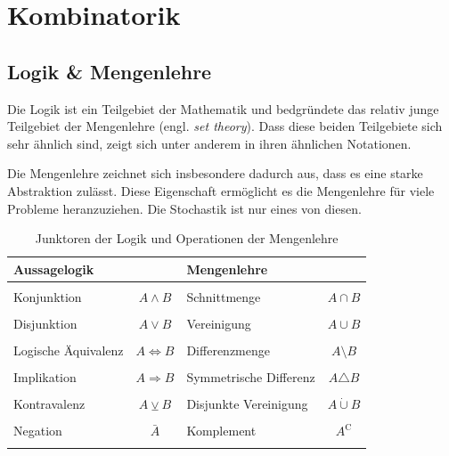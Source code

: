 



\chapter{Kombinatorik}
\newpage

\section{Logik \& Mengenlehre}
Die Logik ist ein Teilgebiet der Mathematik und bedgründete das relativ
junge Teilgebiet der \gls{Mengenlehre} (engl. \emph{set theory}). 
Dass diese beiden Teilgebiete sich sehr ähnlich sind, zeigt sich 
unter anderem in ihren ähnlichen Notationen.

Die Mengenlehre zeichnet sich insbesondere dadurch aus, 
dass es eine starke \gls{Abstraktion} zulässt.
Diese Eigenschaft ermöglicht es die Mengenlehre für viele Probleme
heranzuziehen. Die Stochastik ist nur eines von diesen.

\begin{table}[h!]
	\centering
	\begin{tabular}{l c |l c}
		Aussagelogik 
			& 
			& Mengenlehre 
			& \\
		\hline
		& & & \\
		Konjunktion
			& $A \land B$
			& Schnittmenge
			& $A \cap B$ \\
		& & & \\
		Disjunktion
			& $A \lor B$
			& Vereinigung
			& $A \cup B$ \\
		& & & \\
		Logische Äquivalenz
			& $A \Leftrightarrow B$
			& Differenzmenge
			& $A \setminus B$ \\
		& & & \\
		Implikation
			& $A \Rightarrow B$  
			& Symmetrische Differenz
			& $A \triangle B$ \\
		& & & \\
		Kontravalenz
			& $A \veebar B$ 
			& Disjunkte Vereinigung
			& $A \dot\cup B$ \\
		& & & \\
		Negation
			& $\bar{A}$
			& Komplement 
			& $A^{\mathrm C}$ \\
		& & & \\
	\end{tabular}
	\caption{Junktoren der Logik und Operationen der 
		Mengenlehre}
\end{table}

